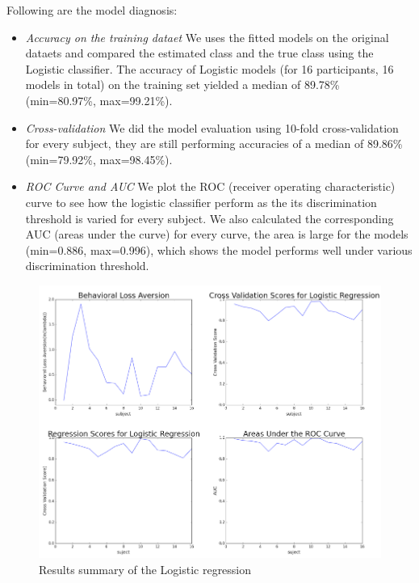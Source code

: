 \documentclass[11pt]{article}
\begin{document}
Following are the model diagnosis:

\begin{itemize}
\item \emph{Accuracy on the training dataet} We uses the fitted models on the original dataets and compared the estimated class and the true class using the Logistic classifier. The accuracy of Logistic models (for 16 participants, 16 models in total) on the training set yielded a median of 89.78\% (min=80.97\%, max=99.21\%).
\item \emph{Cross-validation} We did the model evaluation using 10-fold cross-validation for every subject, they are still performing accuracies of a median of 89.86\% (min=79.92\%, max=98.45\%).
\item \emph{ROC Curve and AUC} We plot the ROC (receiver operating characteristic) curve to see how the logistic classifier perform as the its discrimination threshold is varied for every subject. We also calculated the corresponding AUC (areas under the curve) for every curve, the area is large for the models (min=0.886, max=0.996), which shows the model performs well under various discrimination threshold.

\end{itemize}

\begin{figure}[H]
    \centering
        \includegraphics[scale=0.4]{figures/Regression1/logistic_summary.png}
    \caption{Results summary of the Logistic regression}
\end{figure}
\end{document}
